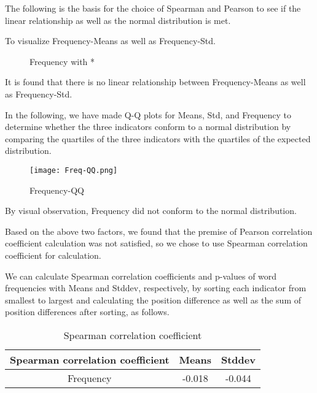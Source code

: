 \documentclass[12pt]{article}  %
\begin{document}
The following is the basis for the choice of Spearman and Pearson to see if the linear relationship as well as the normal distribution is met.

To visualize Frequency-Means as well as Frequency-Std.

\begin{figure}[H]
	\centering    
	\caption{Frequency with *}		%
	\label{img35}									%
\end{figure}


It is found that there is no linear relationship between Frequency-Means as well as Frequency-Std.

In the following, we have made Q-Q plots for Means, Std, and Frequency to determine whether the three indicators conform to a normal distribution by comparing the quartiles of the three indicators with the quartiles of the expected distribution.

\begin{figure}[H]
	\centering
	\texttt{[image: Freq-QQ.png]}
	\caption{Frequency-QQ}
	\label{img22}
\end{figure}

By visual observation, Frequency did not conform to the normal distribution.

Based on the above two factors, we found that the premise of Pearson correlation coefficient calculation was not satisfied, so we chose to use Spearman correlation coefficient for calculation.

We can calculate Spearman correlation coefficients and p-values of word frequencies with Means and Stddev, respectively, by sorting each indicator from smallest to largest and calculating the position difference as well as the sum of position differences after sorting, as follows.
\begin{table*}
	\centering
	\begin{tabular}{  |c|c|c|
		}
		
		\hline
		Spearman correlation coefficient 	& Means & Stddev \\ 
		\hline
		Frequency	& -0.018  &  -0.044 \\ 
		\hline 
		
	\end{tabular}
	\caption{Spearman correlation coefficient}
	\label{tab:Spearson-f}
\end{table*}
\end{document}
